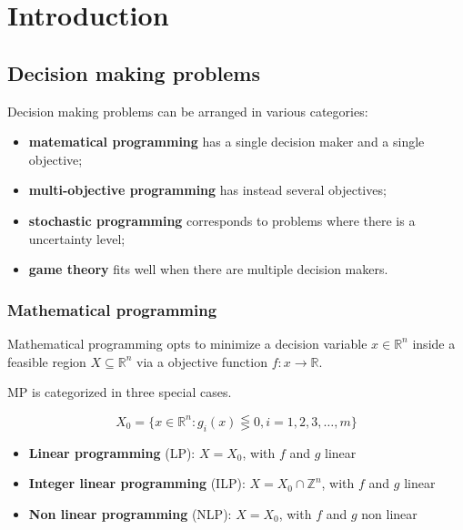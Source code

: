 \section{Introduction}

\subsection{Decision making problems}

Decision making problems can be arranged in various categories:

\begin{itemize}
    \item \textbf{matematical programming} has a single decision maker and a single objective;
    \item \textbf{multi-objective programming} has instead several objectives;
    \item \textbf{stochastic programming} corresponds to problems where there is a uncertainty level;
    \item \textbf{game theory} fits well when there are multiple decision makers.
\end{itemize}

\subsubsection{Mathematical programming}

Mathematical programming opts to minimize a decision variable $x \in \mathbb{R}^n$ inside a feasible region $X \subseteq \mathbb{R}^n$
via a objective function $f: x \rightarrow \mathbb{R}$.

MP is categorized in three special cases.

$$X_0 = \Biggl\{ x \in \mathbb{R}^n : g_i(x) \lesseqgtr 0 , i=1, 2, 3, \dots, m \Biggr\}$$

\begin{itemize}
    \item \textbf{Linear programming} (LP): $X = X_0$, with $f$ and $g$ linear
    \item \textbf{Integer linear programming} (ILP): $X = X_0 \cap \mathbb{Z}^n$, with $f$ and $g$ linear
    \item \textbf{Non linear programming} (NLP): $X = X_0$, with $f$ and $g$ non linear
\end{itemize}
